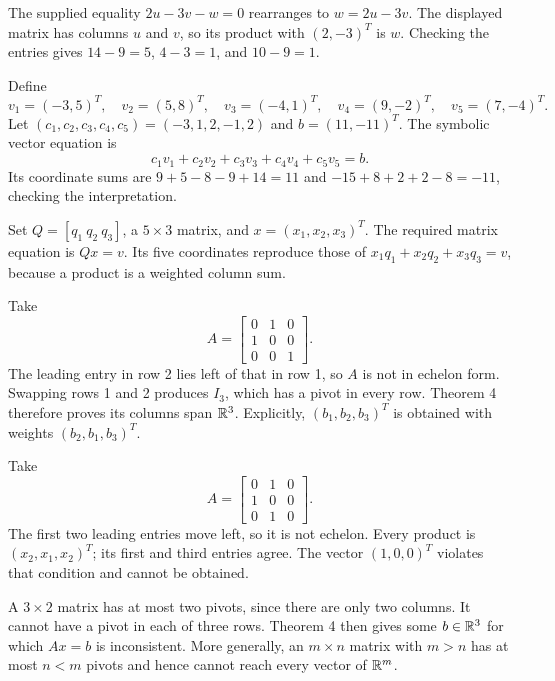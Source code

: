 The supplied equality $2u-3v-w=0$ rearranges to $w=2u-3v$.
The displayed matrix has columns $u$ and $v$, so its product with
$(2,-3)^T$ is $w$. Checking the entries gives
$14-9=5$, $4-3=1$, and $10-9=1$.

Define
\[v_1=(-3,5)^T,\quad v_2=(5,8)^T,\quad v_3=(-4,1)^T,
\quad v_4=(9,-2)^T,\quad v_5=(7,-4)^T.\]
Let $(c_1,c_2,c_3,c_4,c_5)=(-3,1,2,-1,2)$ and $b=(11,-11)^T$.
The symbolic vector equation is
\[c_1v_1+c_2v_2+c_3v_3+c_4v_4+c_5v_5=b.\]
Its coordinate sums are $9+5-8-9+14=11$ and
$-15+8+2+2-8=-11$, checking the interpretation.

Set $Q=[q_1\ q_2\ q_3]$, a $5\times3$ matrix, and
$x=(x_1,x_2,x_3)^T$. The required matrix equation is $Qx=v$.
Its five coordinates reproduce those of
$x_1q_1+x_2q_2+x_3q_3=v$, because a product is a weighted column sum.

Take
\[A=\begin{bmatrix}0&1&0\\1&0&0\\0&0&1\end{bmatrix}.\]
The leading entry in row 2 lies left of that in row 1, so $A$ is not
in echelon form. Swapping rows 1 and 2 produces $I_3$, which has a
pivot in every row. Theorem 4 therefore proves its columns span
$\mathbb{R}^3$. Explicitly, $(b_1,b_2,b_3)^T$ is obtained with weights
$(b_2,b_1,b_3)^T$.

Take
\[A=\begin{bmatrix}0&1&0\\1&0&0\\0&1&0\end{bmatrix}.\]
The first two leading entries move left, so it is not echelon.
Every product is $(x_2,x_1,x_2)^T$; its first and third entries agree.
The vector $(1,0,0)^T$ violates that condition and cannot be obtained.

A $3\times2$ matrix has at most two pivots, since there are only two
columns. It cannot have a pivot in each of three rows. Theorem 4
then gives some $b\in\mathbb{R}^3$ for which $Ax=b$ is inconsistent.
More generally, an $m\times n$ matrix with $m>n$ has at most $n<m$
pivots and hence cannot reach every vector of $\mathbb{R}^m$.


